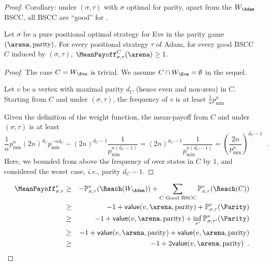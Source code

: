 \begin{proof}
    Corollary: under $(\sigma,\tau)$ with $\sigma$ optimal for parity,
    apart from the $W_\Adam$ BSCC, all BSCC are ``good'' for \Eve.

    \begin{lemma}
      Let $\sigma$ be a pure positional optimal strategy for Eve in
      the parity game $(\arena,\textrm{parity})$. For every positional
      strategy $\tau$ of Adam, for every good BSCC $C$ induced by
      $(\sigma,\tau)$, $\MeanPayoff_{\sigma,\tau}^C(\arena) \geq 1$.
    \end{lemma}
    \begin{proof}
      The case $C = W_\Eve$ is trivial. We assume
      $C \cap W_\Eve = \emptyset$ in the sequel.
      
      Let $v$ be a vertex with maximal parity $d_C$ (hence even and
      non-zero) in $C$. Starting from $C$ and under $(\sigma,\tau)$,
      the frequency of $v$ is at least $\frac{1}{n} p_{\min}^n$

      Given the definition of the weight function, the mean-payoff
      from $C$ and under $(\sigma,\tau)$ is at least
      \[
        \frac{1}{n} p_{\min}^n (2n)^{d_C} p_{\min}^{-n d_C} -
        (2n)^{d_C -1} \frac{1}{p_{\min}^{n (d_C-1)}} = (2n)^{d_C -1}
        \frac{1}{p_{\min}^{n (d_C-1)}} =
        (\frac{2n}{p_{\min}^n})^{d_C{-}1}\enspace.
      \]
      Here, we bounded from above the frequency of over states in $C$
      by $1$, and considered the worst case, \emph{i.e.}, parity
      $d_C-1$.
    \end{proof}

    \begin{eqnarray*}
      \MeanPayoff_{\sigma,\tau}^{v} & \geq & - \probm_{\sigma,\tau}^v(\Reach(W_\Adam)) + \sum_{C \textrm{ Good BSCC}} \probm_{\sigma,\tau}^v(\Reach(C))\\
                                    & \geq & -1 + \mathsf{value}(v,\arena,\textrm{parity}) + \probm_{\sigma,\tau}^v(\Parity)\\
                                    & \geq & -1 + \mathsf{value}(v,\arena,\textrm{parity}) + \inf_{\tau'} \probm_{\sigma,\tau'}^v(\Parity)\\
                                    & \geq & -1 + \mathsf{value}(v,\arena,\textrm{parity}) + \mathsf{value}(v,\arena,\textrm{parity})\\
                                    &  \geq & -1 + 2  \mathsf{value}(v,\arena,\textrm{parity}) \enspace.
    \end{eqnarray*}


\end{proof}
